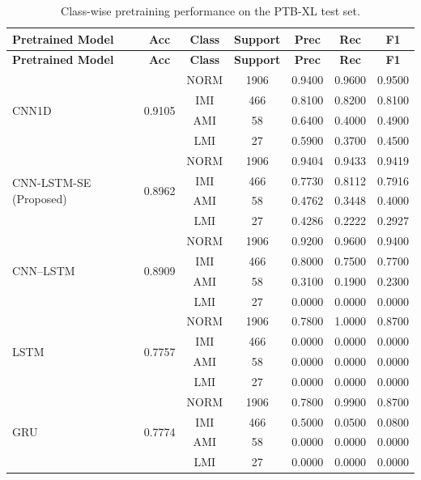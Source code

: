 \documentclass[preprint,12pt]{elsarticle}
\begin{document}
\begin{longtable}{p{4.9cm}c c c c c c}
\caption{Class-wise pretraining performance on the PTB-XL test set.}\label{tab:ptbxl_pretrain_classwise}\\
\toprule
\textbf{Pretrained Model} & \textbf{Acc} & \textbf{Class} & \textbf{Support} & \textbf{Prec} & \textbf{Rec} & \textbf{F1} \\
\midrule
\endfirsthead
\toprule
\textbf{Pretrained Model} & \textbf{Acc} & \textbf{Class} & \textbf{Support} & \textbf{Prec} & \textbf{Rec} & \textbf{F1} \\
\midrule
\endhead

\multirow{4}{=}{\raggedright CNN1D} & \multirow{4}{*}{0.9105}
& NORM & 1906 & 0.9400 & 0.9600 & 0.9500 \\
& & IMI  & 466  & 0.8100 & 0.8200 & 0.8100 \\
& & AMI  & 58   & 0.6400 & 0.4000 & 0.4900 \\
& & LMI  & 27   & 0.5900 & 0.3700 & 0.4500 \\
\midrule

\multirow{4}{=}{\raggedright CNN-LSTM-SE (Proposed)} & \multirow{4}{*}{0.8962}
& NORM & 1906 & 0.9404 & 0.9433 & 0.9419 \\
& & IMI  & 466  & 0.7730 & 0.8112 & 0.7916 \\
& & AMI  & 58   & 0.4762 & 0.3448 & 0.4000 \\
& & LMI  & 27   & 0.4286 & 0.2222 & 0.2927 \\
\midrule

\multirow{4}{=}{\raggedright CNN--LSTM} & \multirow{4}{*}{0.8909}
& NORM & 1906 & 0.9200 & 0.9600 & 0.9400 \\
& & IMI  & 466  & 0.8000 & 0.7500 & 0.7700 \\
& & AMI  & 58   & 0.3100 & 0.1900 & 0.2300 \\
& & LMI  & 27   & 0.0000 & 0.0000 & 0.0000 \\
\midrule

\multirow{4}{=}{\raggedright LSTM} & \multirow{4}{*}{0.7757}
& NORM & 1906 & 0.7800 & 1.0000 & 0.8700 \\
& & IMI  & 466  & 0.0000 & 0.0000 & 0.0000 \\
& & AMI  & 58   & 0.0000 & 0.0000 & 0.0000 \\
& & LMI  & 27   & 0.0000 & 0.0000 & 0.0000 \\
\midrule

\multirow{4}{=}{\raggedright GRU} & \multirow{4}{*}{0.7774}
& NORM & 1906 & 0.7800 & 0.9900 & 0.8700 \\
& & IMI  & 466  & 0.5000 & 0.0500 & 0.0800 \\
& & AMI  & 58   & 0.0000 & 0.0000 & 0.0000 \\
& & LMI  & 27   & 0.0000 & 0.0000 & 0.0000 \\
\bottomrule
\end{longtable}
\end{document}
